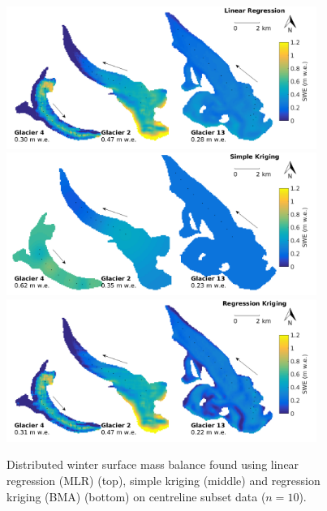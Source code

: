 \documentclass[12pt]{article}
\begin{document}
\begin{figure}[H]
	\centering
	\includegraphics[width =0.9\textwidth]{MapSubset_LRcentreline_n10S4.png}\\
	\includegraphics[width =0.9\textwidth]{MapSubset_SKcentreline_n10S4.png}\\
	\includegraphics[width =0.9\textwidth]{MapSubset_RKcentreline_n10S4.png}\\
	\caption{Distributed winter surface mass balance found using  linear regression (MLR) (top), simple kriging (middle) and regression kriging (BMA) (bottom) on centreline subset data ($n=10$).}
	\label{fig:MapSubset_centreline_n10S4}
\end{figure}
\end{document}
